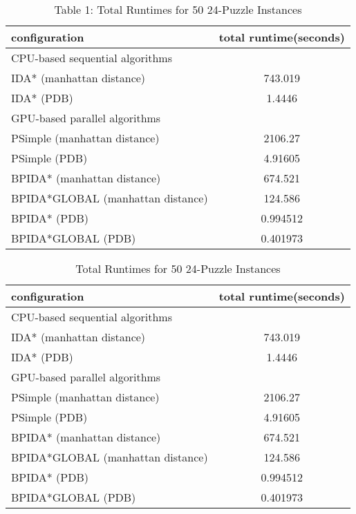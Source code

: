 \documentclass[a4paper,11pt,oneside,openany]{jsbook}
\begin{document}
\begin{table}[]
\centering
\caption{Table 1: Total Runtimes for 50 24-Puzzle Instances}
\label{my-label}
\begin{tabular}{|l|c|}
\hline
configuration & \multicolumn{1}{l|}{total runtime(seconds)} \\ \hline
\multicolumn{2}{|l|}{CPU-based sequential algorithms} \\ \hline
IDA* (manhattan distance) & 743.019 \\
IDA* (PDB) & 1.4446 \\ \hline
\multicolumn{2}{|l|}{GPU-based parallel algorithms} \\ \hline
PSimple (manhattan distance) & 2106.27 \\
PSimple (PDB) & 4.91605 \\
BPIDA* (manhattan distance) & 674.521 \\
BPIDA*GLOBAL (manhattan distance) & 124.586 \\
BPIDA* (PDB) & 0.994512 \\
BPIDA*GLOBAL (PDB) & 0.401973 \\ \hline
\end{tabular}
\end{table}

\begin{table}[]
\centering
\caption{Total Runtimes for 50 24-Puzzle Instances}
\label{my-label}
\begin{tabular}{|l|c|}
\hline
configuration & \multicolumn{1}{l|}{total runtime(seconds)} \\ \hline
\multicolumn{2}{|l|}{CPU-based sequential algorithms} \\ \hline
IDA* (manhattan distance) & 743.019 \\
IDA* (PDB) & 1.4446 \\ \hline
\multicolumn{2}{|l|}{GPU-based parallel algorithms} \\ \hline
PSimple (manhattan distance) & 2106.27 \\
PSimple (PDB) & 4.91605 \\
BPIDA* (manhattan distance) & 674.521 \\
BPIDA*GLOBAL (manhattan distance) & 124.586 \\
BPIDA* (PDB) & 0.994512 \\
BPIDA*GLOBAL (PDB) & 0.401973 \\ \hline
\end{tabular}
\end{table}
\end{document}
